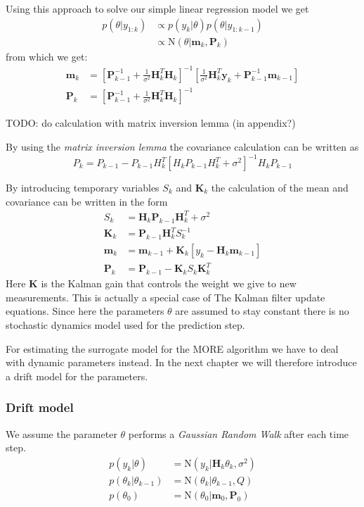 Using this approach to solve our simple linear regression model we get
\begin{align}
  p(\theta | y_{1:k}) &\propto p(y_k | \theta) p(\theta | y_{1:k-1}) \\
                      &\propto \text{N}(\theta | \mathbf{m}_k, \mathbf{P}_k)
\end{align}
from which we get:
\begin{align}
  \mathbf{m}_k &= \left[ \mathbf{P}^{-1}_{k-1}
                 + \frac{1}{\sigma^2} \mathbf{H}^T_k \mathbf{H}_k \right]^{-1}
                 \left[\frac{1}{\sigma^2} \mathbf{H}^T_k \mathbf{y}_k +
                 \mathbf{P}^{-1}_{k-1} \mathbf{m}_{k-1} \right] \\
  \mathbf{P}_k &= \left[\mathbf{P}_{k-1}^{-1}
                 + \frac{1}{\sigma^2} \mathbf{H}^T_k \mathbf{H}_k \right]^{-1}
\end{align}

TODO: do calculation with matrix inversion lemma (in appendix?)

By using the \textit{matrix inversion lemma} the covariance calculation can be
written as
$$ P_k = P_{k-1} - P_{k-1} H_k^T [H_k P_{k-1} H_k^T + \sigma^2]^{-1} H_k P_{k-1} $$

By introducing temporary variables $S_k$ and $\mathbf{K}_k$ the calculation of
the mean and covariance can be written in the form
\begin{align*}
     S_k &= \textbf{H}_k \textbf{P}_{k-1} \textbf{H}^T_k + \sigma^2 \\
     \textbf{K}_k &= \textbf{P}_{k-1} \textbf{H}^T_k S_k^{-1} \\
     \textbf{m}_k &= \textbf{m}_{k-1} + \textbf{K}_k [y_k - \textbf{H}_k \textbf{m}_{k-1}] \\
     \textbf{P}_k &= \textbf{P}_{k-1} - \textbf{K}_k S_k \textbf{K}_k^T
\end{align*}
Here $\mathbf{K}$ is the Kalman gain that controls the weight we give to new
measurements.
This is actually a special case of The Kalman filter update equations.
Since here the parameters $\theta$ are assumed to stay constant there is
no stochastic dynamics model used for the prediction step.

For estimating the surrogate model for the MORE algorithm we have to
deal with dynamic parameters instead. In the next chapter we will therefore
introduce a drift model for the parameters.

\subsubsection{Drift model}
We assume the parameter $\theta$ performs a \textit{Gaussian Random Walk} after
each time step.
\begin{align}
  p(y_k | \theta) &= \text{N}(y_k | \mathbf{H}_k \theta_k, \sigma^2) \\
  p(\theta_k | \theta_{k-1}) &= \text{N} (\theta_k | \theta_{k-1}, Q) \\
  p(\theta_0) &= \text{N}(\theta_0 | \mathbf{m}_0, \mathbf{P}_0)
\end{align}

